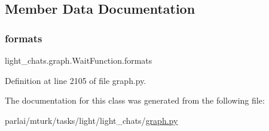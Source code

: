 \subsection{Member Data Documentation}
\mbox{\label{classlight__chats_1_1graph_1_1WaitFunction_a02e41ee37f4a2fe83153606100a5f979}} 
\subsubsection{\texorpdfstring{formats}{formats}}
{\footnotesize\ttfamily light\+\_\+chats.\+graph.\+Wait\+Function.\+formats}



Definition at line 2105 of file graph.\+py.



The documentation for this class was generated from the following file\+:\begin{DoxyCompactItemize}
\item 
parlai/mturk/tasks/light/light\+\_\+chats/\hyperlink{parlai_2mturk_2tasks_2light_2light__chats_2graph_8py}{graph.\+py}\end{DoxyCompactItemize}
